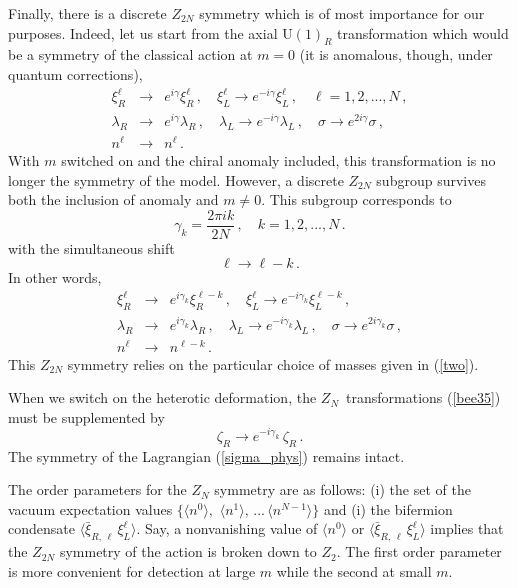\documentclass[epsfig,12pt]{article}
\def\beq{\begin{equation}}
\def\eeq{\end{equation}}
\def\beqn{\begin{eqnarray}}
\def\eeqn{\end{eqnarray}}
\newcommand{\zn}{$Z_N$}
\def\beqn{\begin{eqnarray}}
\def\eeqn{\end{eqnarray}}
\def\beq{\begin{equation}}
\def\eeq{\end{equation}}
\begin{document}
{Finally, there is a discrete $Z_{2N}$ symmetry which is of most importance for our purposes.
Indeed, let us start from the axial U$(1)_R$ transformation which would be a symmetry
of the classical action at $m=0$ 
 (it is anomalous, though, under quantum corrections),
\beqn
\xi^\ell_R 
&\to& 
e^{i\gamma}\xi^\ell_R\,, \quad
 \xi^\ell_L \to e^{-i\gamma }\xi^\ell_L\,,\quad \ell=1,2, ..., N\,,
 \nonumber\\[2mm]
 \lambda_R 
&\to&
 e^{i\gamma}\lambda_R\,,\quad 
 \lambda_L \to e^{-i\gamma}\lambda_L\,,\quad \sigma \to e^{2i\gamma}\sigma\,,
\nonumber\\[2mm]
n^\ell
&\to&
 n^\ell\,.
 \label{appe11}
\eeqn
With $m$ switched on and the chiral anomaly included, this transformation 
is no longer the symmetry of the model. However, a discrete $Z_{2N}$ subgroup survives both the inclusion of anomaly and $m\neq 0$. This subgroup corresponds to
\beq
\gamma_k =\frac{2\pi i k}{2N}\,,\quad k= 1,2, ..., N\,.
\label{appe12}
\eeq
with the simultaneous shift
\beq
\ell\to \ell - k\,.
\label{appe13}
\eeq
In other words,
\beqn
\xi^\ell_R 
&\to& 
e^{i\gamma_k}\xi^{\ell-k}_R\,, \quad
 \xi^\ell_L \to e^{-i\gamma_k }\xi^{\ell-k}_L\,, 
 \nonumber\\[2mm]
 \lambda_R 
&\to&
 e^{i\gamma_k}\lambda_R\,,\quad 
 \lambda_L \to e^{-i\gamma_k}\lambda_L\,,\quad \sigma \to e^{2i\gamma_k}\sigma\,,
 \nonumber\\[2mm]
 n^\ell &\to & n^{\ell-k}\,.
 \label{bee35}
\eeqn
This $Z_{2N}$ symmetry  relies on the particular choice of masses 
given in (\ref{two}).

When we switch on the heterotic deformation, the \zn\, transformations (\ref{bee35}) must be supplemented by
\beq
\zeta_R \to  e^{-i\gamma_k }\, \zeta_R\,.
\label{bee35p}
\eeq
The symmetry of the Lagrangian (\ref{sigma_phys}) remains intact.


The order parameters for the $Z_N$ symmetry are as follows:
(i) the set of the vacuum expectation values
$\{ \langle n^0\rangle,\,\, \langle n^1\rangle, \,...\, \langle n^{N-1}\rangle\}$
and (i) the bifermion condensate $\langle  \bar\xi_{R,\,\ell}\,\xi^\ell_L\rangle$.
Say, a nonvanishing value of $\langle n^0\rangle$ or  $\langle  \bar\xi_{R,\,\ell}\,\xi^\ell_L\rangle$ implies that the $Z_{2N}$ symmetry of the action is broken down to
$Z_2$. The first order parameter is more convenient for detection
at large $m$ while the second at small $m$. 

}
\end{document}
